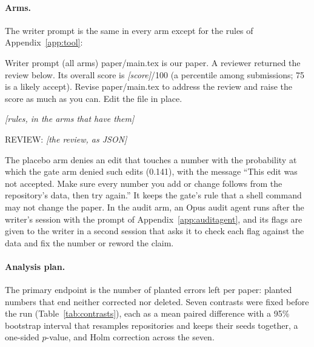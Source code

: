 \paragraph{Arms.}
The writer prompt is the same in every arm except for the rules of Appendix~\ref{app:tool}:
\begin{promptbox}{Writer prompt (all arms)}
paper/main.tex is our paper. A reviewer returned the review below. Its overall score is \emph{[score]}/100 (a
percentile among submissions; 75 is a likely accept). Revise paper/main.tex to address the review and raise the score
as much as you can. Edit the file in place.

\emph{[rules, in the arms that have them]}

REVIEW: \emph{[the review, as JSON]}
\end{promptbox}
The placebo arm denies an edit that touches a number with the probability at which the gate arm denied such edits
(0.141), with the message ``This edit was not accepted. Make sure every number you add or change follows from the
repository's data, then try again.'' It keeps the gate's rule that a shell command may not change the paper. In the
audit arm, an Opus audit agent runs after the writer's session with the prompt of Appendix~\ref{app:auditagent}, and
its flags are given to the writer in a second session that asks it to check each flag against the data and fix the
number or reword the claim.

\paragraph{Analysis plan.}
The primary endpoint is the number of planted errors left per paper: planted numbers that end neither corrected nor
deleted. Seven contrasts were fixed before the run (Table~\ref{tab:contrasts}), each as a mean paired difference with
a 95\% bootstrap interval that resamples repositories and keeps their seeds together, a one-sided $p$-value, and Holm
correction across the seven.

